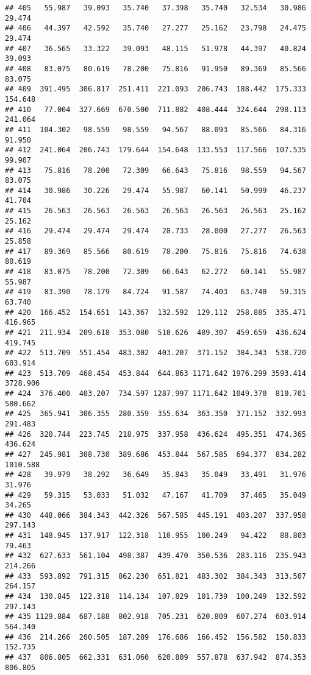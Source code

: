 \documentclass[
]{article}
\begin{document}
\begin{verbatim}
## 405   55.987   39.093   35.740   37.398   35.740   32.534   30.986   29.474
## 406   44.397   42.592   35.740   27.277   25.162   23.798   24.475   29.474
## 407   36.565   33.322   39.093   48.115   51.978   44.397   40.824   39.093
## 408   83.075   80.619   78.200   75.816   91.950   89.369   85.566   83.075
## 409  391.495  306.817  251.411  221.093  206.743  188.442  175.333  154.648
## 410   77.004  327.669  670.500  711.882  408.444  324.644  298.113  241.064
## 411  104.302   98.559   98.559   94.567   88.093   85.566   84.316   91.950
## 412  241.064  206.743  179.644  154.648  133.553  117.566  107.535   99.907
## 413   75.816   78.200   72.309   66.643   75.816   98.559   94.567   83.075
## 414   30.986   30.226   29.474   55.987   60.141   50.999   46.237   41.704
## 415   26.563   26.563   26.563   26.563   26.563   26.563   25.162   25.162
## 416   29.474   29.474   29.474   28.733   28.000   27.277   26.563   25.858
## 417   89.369   85.566   80.619   78.200   75.816   75.816   74.638   80.619
## 418   83.075   78.200   72.309   66.643   62.272   60.141   55.987   55.987
## 419   83.390   78.179   84.724   91.587   74.403   63.740   59.315   63.740
## 420  166.452  154.651  143.367  132.592  129.112  258.885  335.471  416.965
## 421  211.934  209.618  353.080  510.626  489.307  459.659  436.624  419.745
## 422  513.709  551.454  483.302  403.207  371.152  384.343  538.720  603.914
## 423  513.709  468.454  453.844  644.863 1171.642 1976.299 3593.414 3728.906
## 424  376.400  403.207  734.597 1287.997 1171.642 1049.370  810.701  580.662
## 425  365.941  306.355  280.359  355.634  363.350  371.152  332.993  291.483
## 426  320.744  223.745  218.975  337.958  436.624  495.351  474.365  436.624
## 427  245.981  308.730  389.686  453.844  567.585  694.377  834.282 1010.588
## 428   39.979   38.292   36.649   35.843   35.049   33.491   31.976   31.976
## 429   59.315   53.033   51.032   47.167   41.709   37.465   35.049   34.265
## 430  448.066  384.343  442.326  567.585  445.191  403.207  337.958  297.143
## 431  148.945  137.917  122.318  110.955  100.249   94.422   88.803   79.463
## 432  627.633  561.104  498.387  439.470  350.536  283.116  235.943  214.266
## 433  593.892  791.315  862.230  651.821  483.302  384.343  313.507  264.157
## 434  130.845  122.318  114.134  107.829  101.739  100.249  132.592  297.143
## 435 1129.884  687.188  802.918  705.231  620.809  607.274  603.914  564.340
## 436  214.266  200.505  187.289  176.686  166.452  156.582  150.833  152.735
## 437  806.805  662.331  631.060  620.809  557.878  637.942  874.353  806.805

\end{verbatim}
\end{document}

